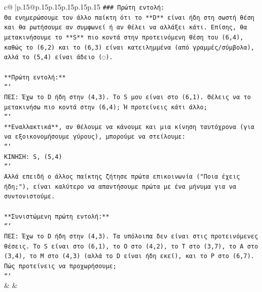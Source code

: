 \documentclass{article}
\begin{document}
{\begin{supertabular}{c@{$\;$}|p{.15\linewidth}@{}p{.15\linewidth}p{.15\linewidth}p{.15\linewidth}p{.15\linewidth}p{.15\linewidth}}
{{{\texttt{\#\#\# Πρώτη εντολή:} \\
\texttt{Θα ενημερώσουμε τον άλλο παίκτη ότι το **D** είναι ήδη στη σωστή θέση και θα ρωτήσουμε αν συμφωνεί ή αν θέλει να αλλάξει κάτι. Επίσης, θα μετακινήσουμε το **S** πιο κοντά στην προτεινόμενη θέση του (6,4), καθώς το (6,2) και το (6,3) είναι κατειλημμένα (από γραμμές/σύμβολα), αλλά το (5,4) είναι άδειο (◌).} \\
\\ 
\texttt{**Πρώτη εντολή:**} \\
\texttt{```} \\
\texttt{ΠΕΣ: Έχω το D ήδη στην (4,3). Το S μου είναι στο (6,1). Θέλεις να το μετακινήσω πιο κοντά στην (6,4); Ή προτείνεις κάτι άλλο;} \\
\texttt{```} \\
\texttt{**Εναλλακτικά**, αν θέλουμε να κάνουμε και μια κίνηση ταυτόχρονα (για να εξοικονομήσουμε γύρους), μπορούμε να στείλουμε:} \\
\texttt{```} \\
\texttt{ΚΙΝΗΣΗ: S, (5,4)} \\
\texttt{```} \\
\texttt{Αλλά επειδή ο άλλος παίκτης ζήτησε πρώτα επικοινωνία ("Ποια έχεις ήδη;"), είναι καλύτερο να απαντήσουμε πρώτα με ένα μήνυμα για να συντονιστούμε.} \\
\\ 
\texttt{**Συνιστώμενη πρώτη εντολή:**} \\
\texttt{```} \\
\texttt{ΠΕΣ: Έχω το D ήδη στην (4,3). Τα υπόλοιπα δεν είναι στις προτεινόμενες θέσεις. Το S είναι στο (6,1), το O στο (4,2), το T στο (3,7), το A στο (3,4), το M στο (4,3) (αλλά το D είναι ήδη εκεί), και το P στο (6,7). Πώς προτείνεις να προχωρήσουμε;} \\
\texttt{```} \\
            }
        }
    }
    & & \\ \\


\end{supertabular}}
\end{document}
